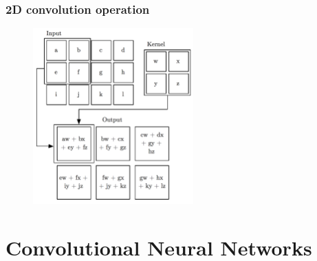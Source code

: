 \documentclass{beamer}
\begin{document}
%
%
%

\begin{frame}
  \frametitle{2D convolution operation}

 \begin{figure}
    \centering
    \includegraphics[width=0.55\textwidth]{convolution_operation.png}
  \end{figure}
\end{frame}

\section{Convolutional Neural Networks}
\end{document}
